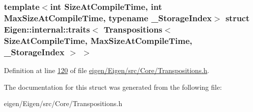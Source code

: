 \subsubsection*{template$<$int Size\+At\+Compile\+Time, int Max\+Size\+At\+Compile\+Time, typename \+\_\+\+Storage\+Index$>$\newline
struct Eigen\+::internal\+::traits$<$ Transpositions$<$ Size\+At\+Compile\+Time, Max\+Size\+At\+Compile\+Time, \+\_\+\+Storage\+Index $>$ $>$}



Definition at line \hyperlink{eigen_2_eigen_2src_2_core_2_transpositions_8h_source_l00120}{120} of file \hyperlink{eigen_2_eigen_2src_2_core_2_transpositions_8h_source}{eigen/\+Eigen/src/\+Core/\+Transpositions.\+h}.



The documentation for this struct was generated from the following file\+:\begin{DoxyCompactItemize}
\item 
eigen/\+Eigen/src/\+Core/\+Transpositions.\+h\end{DoxyCompactItemize}
